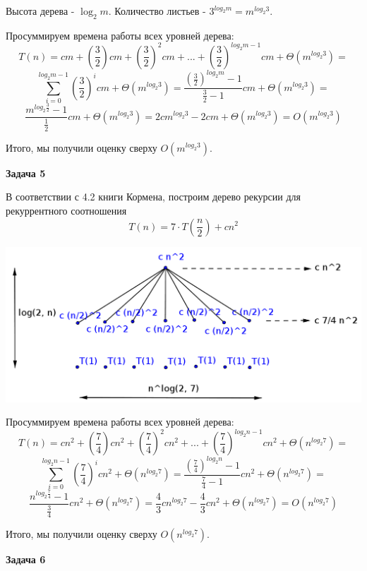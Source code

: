 \documentclass[10pt]{article}
\begin{document}
Высота дерева - $\log_2{m}$.
Количество листьев - $3^{log_2{m}} = m^{log_2{3}}$.

Просуммируем времена работы всех уровней дерева:
$$
  T(n) = c m + \left(\frac{3}{2}\right) c m + \left(\frac{3}{2}\right)^2 c m + ... +
    \left(\frac{3}{2}\right)^{log_2{m} - 1} c m + \Theta(m^{log_2{3}}) =
$$
$$
    \sum\limits_{i=0}^{log_2{m} - 1} \left(\frac{3}{2}\right)^i c m + \Theta(m^{log_2{3}}) =
      \frac{\left(\frac{3}{2}\right)^{log_2{m}} - 1}{\frac{3}{2} - 1} c m + \Theta(m^{log_2{3}}) =
$$
$$
  \frac{m^{log_2{\frac{3}{2}}} - 1}{\frac{1}{2}} c m + \Theta(m^{log_2{3}}) =
    2 c m^{log_2{3}} - 2 c m + \Theta(m^{log_2{3}}) =
    O(m^{log_2{3}})
$$

Итого, мы получили оценку сверху $O(m^{log_2{3}})$.

\medskip

{\bf Задача 5}

В соответствии с 4.2 книги Кормена, построим дерево рекурсии для рекуррентного соотношения
$$
  T(n) = 7 \cdot T\left(\frac{n}{2}\right) + c n^2
$$

\centerline{\includegraphics{5.png}}

Просуммируем времена работы всех уровней дерева:
$$
  T(n) = c n^2 + \left(\frac{7}{4}\right) c n^2 + \left(\frac{7}{4}\right)^2 c n^2 + ... +
    \left(\frac{7}{4}\right)^{log_2{n} - 1} c n^2 + \Theta(n^{log_2{7}}) =
$$
$$
    \sum\limits_{i=0}^{log_2{n} - 1} \left(\frac{7}{4}\right)^i c n^2 + \Theta(n^{log_2{7}}) =
      \frac{\left(\frac{7}{4}\right)^{log_2{n}} - 1}{\frac{7}{4} - 1} c n^2 + \Theta(n^{log_2{7}}) =
$$
$$
  \frac{n^{log_2{\frac{7}{4}}} - 1}{\frac{3}{4}} c n^2 + \Theta(n^{log_2{7}}) =
    \frac{4}{3} c n^{log_2{7}} - \frac{4}{3} c n^2 + \Theta(n^{log_2{7}}) =
    O(n^{log_2{7}})
$$

Итого, мы получили оценку сверху $O(n^{log_2{7}})$.

\medskip

{\bf Задача 6}
\end{document}
